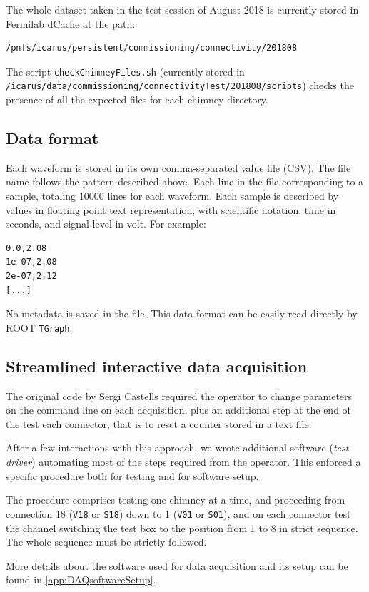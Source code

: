 The whole dataset taken in the test session of August 2018 is currently
stored in Fermilab dCache at the path:

\begin{verbatim}
/pnfs/icarus/persistent/commissioning/connectivity/201808
\end{verbatim}

The script \texttt{checkChimneyFiles.sh} (currently stored in
\texttt{/icarus/data/commissioning/connectivityTest/201808/scripts})
checks the presence of all the expected files for each chimney
directory.

\subsection{Data format}
\label{ssec:data-format}

Each waveform is stored in its own comma-separated value file (CSV). The
file name follows the pattern described above. Each line in the file
corresponding to a sample, totaling 10000 lines for each waveform. Each
sample is described by values in floating point text representation,
with scientific notation: time in seconds, and signal level in volt. For
example:

\begin{verbatim}
0.0,2.08
1e-07,2.08
2e-07,2.12
[...]
\end{verbatim}

No metadata is saved in the file. This data format can be easily read
directly by ROOT \texttt{TGraph}.

\subsection{Streamlined interactive data acquisition}
\label{ssec:streamlined-interactive-data-acquisition}

The original code by Sergi Castells required the operator to change
parameters on the command line on each acquisition, plus an additional
step at the end of the test each connector, that is to reset a counter
stored in a text file.

After a few interactions with this approach, we wrote additional
software (\emph{test driver}) automating most of the steps required from
the operator. This enforced a specific procedure both for testing and
for software setup.

The procedure comprises testing one chimney at a time, and proceeding
from connection 18 (\texttt{V18} or \texttt{S18}) down to 1
(\texttt{V01} or \texttt{S01}), and on each connector test the channel
switching the test box to the position from 1 to 8 in strict sequence.
The whole sequence must be strictly followed.

More details about the software used for data acquisition and its setup can be
found in \cref{app:DAQsoftwareSetup}.
